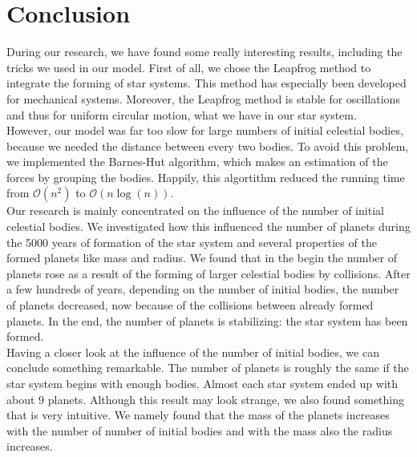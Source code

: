 \section{Conclusion}

During our research, we have found some really interesting results, including the tricks we used in our model.
First of all, we chose the Leapfrog method to integrate the forming of star systems.
This method has especially been developed for mechanical systems.
Moreover, the Leapfrog method is stable for oscillations and thus for uniform circular motion, what we have in our star system.\\

However, our model was far too slow for large numbers of initial celestial bodies, because we needed the distance between every two bodies.
To avoid this problem, we implemented the Barnes-Hut algorithm, which makes an estimation of the forces by grouping the bodies.
Happily, this algortithm reduced the running time from $\mathcal{O}(n^2)$ to $\mathcal{O}(n\log(n))$.\\

Our research is mainly concentrated on the influence of the number of initial celestial bodies.
We investigated how this influenced the number of planets during the 5000 years of formation of the star system and several properties of the formed planets like mass and radius.
We found that in the begin the number of planets rose as a result of the forming of larger celestial bodies by collisions.
After a few hundreds of years, depending on the number of initial bodies, the number of planets decreased, now because of the collisions between already formed planets.
In the end, the number of planets is stabilizing: the star system has been formed.\\

Having a closer look at the influence of the number of initial bodies, we can conclude something remarkable.
The number of planets is roughly the same if the star system begins with enough bodies.
Almost each star system ended up with about $9$ planets.
Although this result may look strange, we also found something that is very intuitive.
We namely found that the mass of the planets increases with the number of number of initial bodies and with the mass also the radius increases.\\




